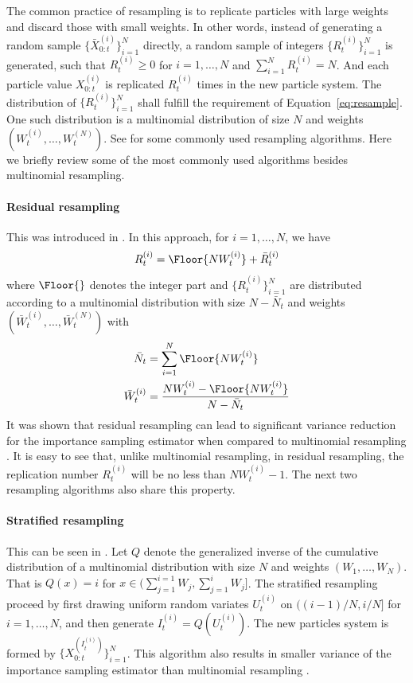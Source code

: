 The common practice of resampling is to replicate particles with large weights
and discard those with small weights. In other words, instead of generating a
random sample $\{\bar{X}_{0:t}^{(i)}\}_{i=1}^N$ directly, a random sample of
integers $\{R_t^{(i)}\}_{i=1}^N$ is generated, such that $R_t^{(i)} \ge 0$ for
$i = 1,\dots,N$ and $\sum_{i=1}^N R_t^{(i)} = N$. And each particle value
$X_{0:t}^{(i)}$ is replicated $R_t^{(i)}$ times in the new particle system.
The distribution of $\{R_t^{(i)}\}_{i=1}^N$ shall fulfill the requirement of
Equation~\ref{eq:resample}. One such distribution is a multinomial
distribution of size $N$ and weights $(W_t^{(i)},\dots,W_t^{(N)})$. See
\cite{Douc:2005wa} for some commonly used resampling algorithms. Here we
briefly review some of the most commonly used algorithms besides multinomial
resampling.

\paragraph{Residual resampling} This was introduced in \cite{Liu:1998iu}. In
this approach, for $i = 1,\dots,N$, we have
\begin{equation}
  R_t^{(i)} = \Floor{NW_t^{(i)}} + \bar{R}_t^{(i)}
\end{equation}
where $\Floor{}$ denotes the integer part and $\{R_t^{(i)}\}_{i=1}^N$ are
distributed according to a multinomial distribution with size $N - \bar{N}_t$
and weights $(\bar{W}_t^{(i)},\dots,\bar{W}_t^{(N)})$ with
\begin{align*}
  \bar{N}_t &= \sum_{i=1}^N\Floor{NW_t^{(i)}} \\
  \bar{W}_t^{(i)} &= \frac{NW_t^{(i)} - \Floor{NW_t^{(i)}}}{N - \bar{N}_t}
\end{align*}
It was shown that residual resampling can lead to significant variance
reduction for the importance sampling estimator when compared to multinomial
resampling \cite{Douc:2005wa}. It is easy to see that, unlike multinomial
resampling, in residual resampling, the replication number $R_t^{(i)}$ will be
no less than $NW_t^{(i)} - 1$. The next two resampling algorithms also share
this property.

\paragraph{Stratified resampling} This can be seen in \cite{Kitagawa:1996vx}.
Let $Q$ denote the generalized inverse of the cumulative distribution of a
multinomial distribution with size $N$ and weights $(W_1,\dots,W_N)$. That is
$Q(x) = i$ for $x\in(\sum_{j=1}^{i=1}W_j,\sum_{j=1}^iW_j]$. The stratified
resampling proceed by first drawing uniform random variates $U_t^{(i)}$ on
$((i-1)/N, i/N]$ for $i = 1,\dots,N$, and then generate $I_t^{(i)} =
Q(U_t^{(i)})$. The new particles system is formed by
$\{X_{0:t}^{(I_t^{(i)})}\}_{i=1}^N$. This algorithm also results in smaller
variance of the importance sampling estimator than multinomial resampling
\cite{Douc:2005wa}.


